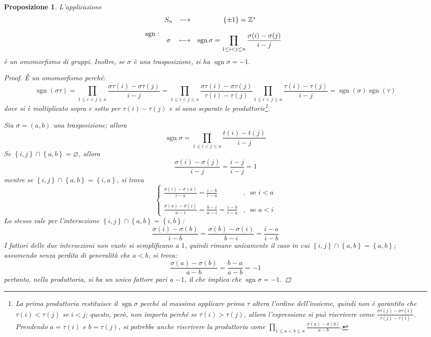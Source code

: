 \documentclass[11pt]{scrartcl}
\theoremstyle{style1}
\newtheorem{prop}{Proposizione}[section]
\numberwithin{equation}{subsection}
\begin{document}
\begin{prop}
	L'applicazione 
	\[
	\operatorname{sgn} :
	\begin{array}
		{c c c}
		S_n & \longrightarrow & \left\{ \pm 1 \right\} = \mathbb{Z}^*\\
		\\
		\sigma & \longmapsto & \operatorname{sgn} \sigma =\displaystyle  \prod_{1\le i< j\le n} \frac{\sigma (i) - \sigma (j)}{i-j}
	\end{array}
	\] 
	\`e un omomorfismo di gruppi. 
	Inoltre, se $\sigma $ \`e una trasposizione, si ha $\operatorname{sgn} \sigma = -1$.
	\begin{proof}
		\`E un omomorfismo perch\'e:
		\[
	\operatorname{sgn} (\sigma \tau )= \prod_{1\le i<j\le n} \frac{\sigma \tau (i)-\sigma \tau (j)}{i-j} =\prod_{1\le i<j\le n} \frac{\sigma \tau (i) - \sigma \tau (j)}{\tau (i) -\tau (j)}\prod_{1\le i<j\le n} \frac{\tau (i) - \tau (j)}{i - j} = \operatorname{sgn} (\sigma) \operatorname{sgn} (\tau)
		\] 
		dove si \`e moltiplicato sopra e sotto per $\tau (i)-\tau (j)$ e si sono separate le produttorie\footnote{La prima produttoria restituisce il $\operatorname{sgn} \sigma $ perch\'e al massimo applicare prima $\tau $ altera l'ordine dell'insieme, quindi non \`e garantito che $\tau (i)< \tau (j)$ se $i<j$; questo, per\`o, non importa perch\'e se $\tau (i)>\tau (j)$, allora l'espressione si pu\`o riscrivere come $\frac{\sigma \tau (j) - \sigma \tau (i)}{\tau (j)-\tau (i)}$. Prendendo $a=\tau (i)$ e $b=\tau (j)$, si potrebbe anche riscrivere la produttoria come $\prod_{1\le a<b\le n} \frac{\sigma (a)-\sigma (b)}{a-b}$.}.

		Sia $\sigma =(a,b)$ una trasposizione; allora
		\[
		\operatorname{sgn} \sigma  = \prod_{1\le i<j\le n} \frac{t(i)-t(j)}{i-j}
		\] 
		Se $\left\{ i,j \right\} \cap \left\{ a,b \right\} = \varnothing$, allora
		\[
		\frac{\sigma (i)-\sigma (j)}{i-j}=\frac{i-j}{i-j}=1
		\] 
		mentre se $\left\{ i,j \right\} \cap \left\{ a,b \right\} = \left\{ i,a \right\} $, si trova
		\[
			\begin{cases}
	\displaystyle 			\frac{\sigma (i) - \sigma (a)}{i-a} = \frac{i-b}{i-a}&,\ \text{ se } i<a\\
	\\
	\displaystyle \frac{\sigma (a) -\sigma (i)}{a-i}=\frac{b-i}{a-i}= \frac{i-b}{i-a}&,\ \text{ se } a < i
			\end{cases}
		\] 
		Lo stesso vale per l'intersezione $\left\{ i,j \right\} \cap \left\{ a,b \right\} = \left\{ i,b \right\} $:
		\[
		\frac{\sigma (i)-\sigma (b)}{i-b}=\frac{\sigma (b)-\sigma (i)}{b-i}=\frac{i-a}{i-b}
		\] 
		I fattori delle due intersezioni non vuote si semplificano a $1$, quindi rimane unicamente il caso in cui $\left\{ i,j \right\} \cap \left\{ a,b \right\} = \left\{ a,b \right\} $; assumendo senza perdita di generalit\`a che $a<b$, si trova:
		\[
		\frac{\sigma (a)-\sigma (b)}{a-b}=\frac{b-a}{a-b}=-1
		\] 
		pertanto, nella produttoria, si ha un unico fattore pari a $-1$, il che implica che $\operatorname{sgn} \sigma =-1$.
	\end{proof}
\end{prop}
\end{document}
